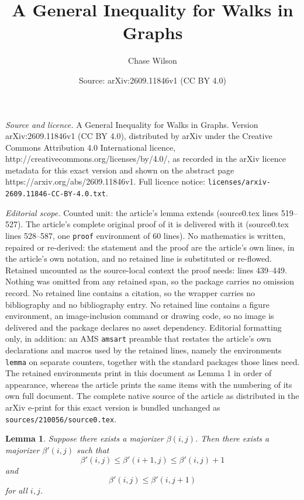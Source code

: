 \documentclass[10pt,a4paper]{amsart}
\title{A General Inequality for Walks in Graphs}
\author{Chase Wilson}
\date{Source: arXiv:2609.11846v1 (CC BY 4.0)}
\newtheorem{lemma}{Lemma}
\begin{document}
\maketitle

\noindent\emph{Source and licence.} A General Inequality for Walks in Graphs. Version arXiv:2609.11846v1 (CC BY 4.0), distributed by arXiv under the Creative Commons Attribution 4.0 International licence, http://creativecommons.org/licenses/by/4.0/, as recorded in the arXiv licence metadata for this exact version and shown on the abstract page https://arxiv.org/abs/2609.11846v1. Full licence notice: \texttt{licenses/arxiv-2609.11846-CC-BY-4.0.txt}.\par\smallskip

\noindent\textit{Editorial scope.} Counted unit: the article's lemma extends (source0.tex lines 519--527). The article's complete original proof of it is delivered with it (source0.tex lines 528--587, one \texttt{proof} environment of 60 lines). No mathematics is written, repaired or re-derived: the statement and the proof are the article's own lines, in the article's own notation, and no retained line is substituted or re-flowed.  Retained uncounted as the source-local context the proof needs: lines 439--449.  Nothing was omitted from any retained span, so the package carries no omission record.  No retained line contains a citation, so the wrapper carries no bibliography and no bibliography entry.  No retained line contains a figure environment, an image-inclusion command or drawing code, so no image is delivered and the package declares no asset dependency.  Editorial formatting only, in addition: an AMS \texttt{amsart} preamble that restates the article's own declarations and macros used by the retained lines, namely the environments \texttt{lemma} on separate counters, together with the standard packages those lines need.  The retained environments print in this document as Lemma 1 in order of appearance, whereas the article prints the same items with the numbering of its own full document.  The complete native source of the article as distributed in the arXiv e-print for this exact version is bundled unchanged as \texttt{sources/210056/source0.tex}.
\begin{lemma} \label{increasing}
Suppose there exists a majorizer $\beta(i,j)$. Then there exists a majorizer $\beta'(i, j)$ such that
\[
\beta'(i, j) \leq \beta'(i + 1, j) \leq \beta'(i, j) + 1
\]
and
\[
\beta'(i, j) \leq \beta'(i, j + 1)
\]
for all $i, j$.
\end{lemma}
\end{document}
